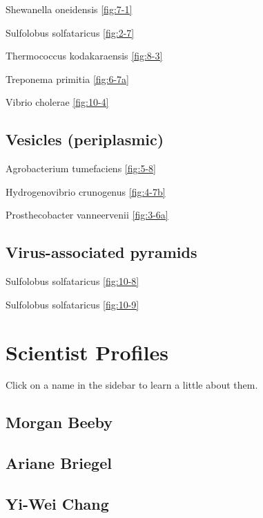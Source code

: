 \documentclass[]{tufte-book}
\begin{document}
Shewanella oneidensis \ref{fig:7-1}

Sulfolobus solfataricus \ref{fig:2-7}

Thermococcus kodakaraensis \ref{fig:8-3}

Treponema primitia \ref{fig:6-7a}

Vibrio cholerae \ref{fig:10-4}

\section*{Vesicles (periplasmic)}\label{vesicles-periplasmic}

Agrobacterium tumefaciens \ref{fig:5-8}

Hydrogenovibrio crunogenus \ref{fig:4-7b}

Prosthecobacter vanneervenii \ref{fig:3-6a}

\section*{Virus-associated pyramids}\label{virus-associated-pyramids}

Sulfolobus solfataricus \ref{fig:10-8}

Sulfolobus solfataricus \ref{fig:10-9}

\chapter{Scientist Profiles}\label{scientist-profiles}

Click on a name in the sidebar to learn a little about them.

\hypertarget{morgan_beeby}{\section*{Morgan Beeby}\label{morgan_beeby}}

\hypertarget{ariane_briegel}{\section*{Ariane
Briegel}\label{ariane_briegel}}

\hypertarget{yi-wei_chang}{\section*{Yi-Wei Chang}\label{yi-wei_chang}}
\end{document}
